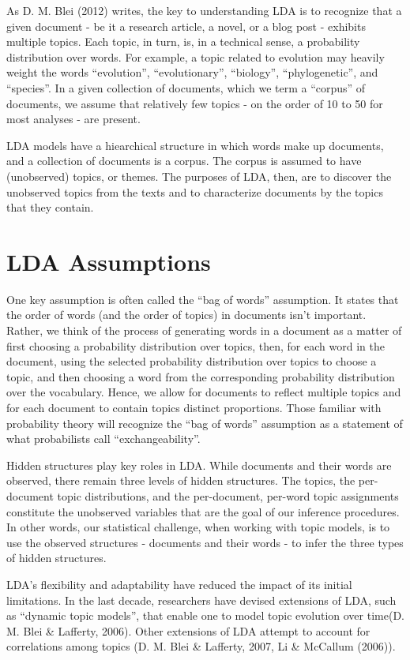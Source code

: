 \documentclass[12pt,]{article}
\begin{document}
As D. M. Blei (2012) writes, the key to understanding LDA is to
recognize that a given document - be it a research article, a novel, or
a blog post - exhibits multiple topics. Each topic, in turn, is, in a
technical sense, a probability distribution over words. For example, a
topic related to evolution may heavily weight the words ``evolution'',
``evolutionary'', ``biology'', ``phylogenetic'', and ``species''. In a
given collection of documents, which we term a ``corpus'' of documents,
we assume that relatively few topics - on the order of 10 to 50 for most
analyses - are present.

LDA models have a hiearchical structure in which words make up
documents, and a collection of documents is a corpus. The corpus is
assumed to have (unobserved) topics, or themes. The purposes of LDA,
then, are to discover the unobserved topics from the texts and to
characterize documents by the topics that they contain.

\section{LDA Assumptions}\label{lda-assumptions}

One key assumption is often called the ``bag of words'' assumption. It
states that the order of words (and the order of topics) in documents
isn't important. Rather, we think of the process of generating words in
a document as a matter of first choosing a probability distribution over
topics, then, for each word in the document, using the selected
probability distribution over topics to choose a topic, and then
choosing a word from the corresponding probability distribution over the
vocabulary. Hence, we allow for documents to reflect multiple topics and
for each document to contain topics distinct proportions. Those familiar
with probability theory will recognize the ``bag of words'' assumption
as a statement of what probabilists call ``exchangeability''.

Hidden structures play key roles in LDA. While documents and their words
are observed, there remain three levels of hidden structures. The
topics, the per-document topic distributions, and the per-document,
per-word topic assignments constitute the unobserved variables that are
the goal of our inference procedures. In other words, our statistical
challenge, when working with topic models, is to use the observed
structures - documents and their words - to infer the three types of
hidden structures.

LDA's flexibility and adaptability have reduced the impact of its
initial limitations. In the last decade, researchers have devised
extensions of LDA, such as ``dynamic topic models'', that enable one to
model topic evolution over time(D. M. Blei \& Lafferty, 2006). Other
extensions of LDA attempt to account for correlations among topics (D.
M. Blei \& Lafferty, 2007, Li \& McCallum (2006)).
\end{document}
